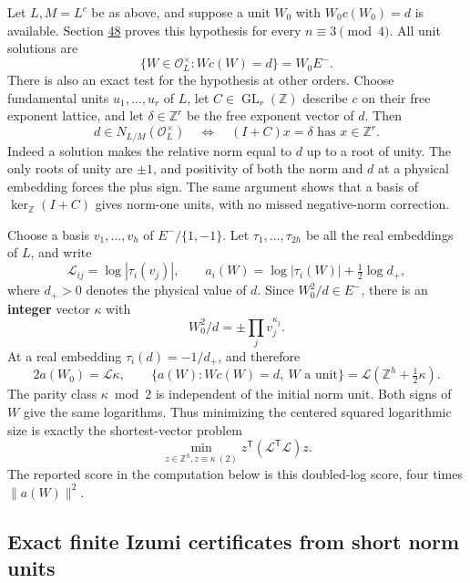 \documentclass[11pt,reqno]{amsart}
\theoremstyle{plain}
\begin{document}
Let \(L,M=L^c\) be as above, and suppose a unit \(W_0\) with
\(W_0c(W_0)=d\) is available. Section \hyperref[sec:48]{48} proves this hypothesis
for every \(n\equiv3\pmod4\). All unit solutions are
\begin{equation*}
 \{W\in\mathcal O_L^\times:Wc(W)=d\}=W_0 E^-.
 \tag{49.1}
\end{equation*}
There is also an exact test for the hypothesis at other orders.
Choose fundamental units \(u_1,\ldots,u_r\) of \(L\), let
\(C\in\operatorname{GL}_r(\mathbb Z)\) describe \(c\) on their
free exponent lattice, and let \(\delta\in\mathbb Z^r\) be the
free exponent vector of \(d\). Then
\begin{equation*}
 d\in N_{L/M}(\mathcal O_L^\times)
 \quad\Longleftrightarrow\quad
 (I+C)x=\delta\text{ has }x\in\mathbb Z^r. \tag{49.2}
\end{equation*}
Indeed a solution makes the relative norm equal to \(d\) up to
a root of unity. The only roots of unity are \(\pm1\), and
positivity of both the norm and \(d\) at a physical embedding
forces the plus sign. The same argument shows that a basis of
\(\ker_{\mathbb Z}(I+C)\) gives norm-one units, with no missed
negative-norm correction.

Choose a basis \(v_1,\ldots,v_h\) of \(E^-/\{1,-1\}\). Let
\(\tau_1,\ldots,\tau_{2h}\) be all the real embeddings of \(L\),
and write
\[
 \mathcal L_{ij}=\log|\tau_i(v_j)|,
 \qquad
 a_i(W)=\log|\tau_i(W)|+\tfrac12\log d_+,
\]
where \(d_+>0\) denotes the physical value of \(d\).
Since \(W_0^2/d\in E^-\), there is an \textbf{integer} vector
\(\kappa\) with
\[
 W_0^2/d=\pm\prod_jv_j^{\kappa_j}.
\]
At a real embedding \(\tau_i(d)=-1/d_+\), and therefore
\begin{equation*}
 2a(W_0)=\mathcal L\kappa,
 \qquad
 \boxed{\{a(W):Wc(W)=d,\ W\text{ a unit}\}
 =\mathcal L(\mathbb Z^h+\tfrac12\kappa).} \tag{49.3}
\end{equation*}
The parity class \(\kappa\bmod2\) is independent of the initial
norm unit. Both signs of \(W\) give the same logarithms. Thus
minimizing the centered squared logarithmic size is exactly the
shortest-vector problem
\begin{equation*}
 \min_{z\in\mathbb Z^h, z\equiv\kappa\ (2)}
 z^{\mathsf T}(\mathcal L^{\mathsf T}\mathcal L)z.
 \tag{49.4}
\end{equation*}
The reported score in the computation below is this doubled-log
score, four times \(\|a(W)\|^2\).

\subsection{Exact finite Izumi certificates from short norm units}\label{sec:49.2}
\end{document}
